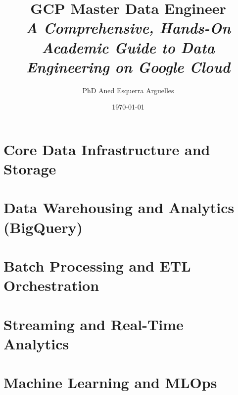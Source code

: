 \documentclass[11pt,a4paper,oneside]{book}
\title{\Huge \textbf{GCP Master Data Engineer}\\[1em]
\Large \textit{A Comprehensive, Hands-On Academic Guide to Data Engineering on Google Cloud}}
\author{PhD Aned Esquerra Arguelles}
\date{\today}
\begin{document}
\frontmatter



\tableofcontents
\listoffigures
\listoftables

\mainmatter

\setcounter{chapter}{-1}


\part{Core Data Infrastructure and Storage}





\part{Data Warehousing and Analytics (BigQuery)}





\part{Batch Processing and ETL Orchestration}





\part{Streaming and Real-Time Analytics}





\part{Machine Learning and MLOps}




\end{document}
